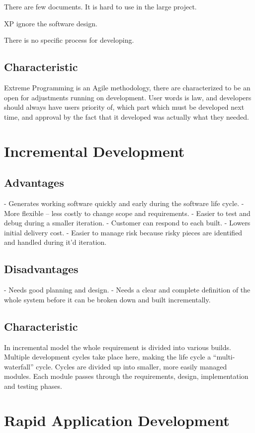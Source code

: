 There are few documents. It is hard to use in the large project.

XP ignore the  software design.

There is no specific process for developing.

\subsection*{Characteristic}
Extreme Programming is an Agile methodology, there are characterized to be an open for adjustments running on development. User words is law, and developers should always have users priority of, which part which must be developed next time, and approval by the fact that it developed was actually what they needed.

\section*{Incremental Development}

\subsection*{Advantages}
- Generates working software quickly and early during the software life cycle.
- More flexible – less costly to change scope and requirements.
- Easier to test and debug during a smaller iteration.
- Customer can respond to each built.
- Lowers initial delivery cost.
- Easier to manage risk because risky pieces are identified and handled during it’d iteration.

\subsection*{Disadvantages}
- Needs good planning and design.
- Needs a clear and complete definition of the whole system before it can be broken down and built incrementally.

\subsection*{Characteristic}
In incremental model the whole requirement is divided into various builds. Multiple development cycles take place here, making the life cycle a “multi-waterfall” cycle.  Cycles are divided up into smaller, more easily managed modules.  Each module passes through the requirements, design, implementation and testing phases.

\section*{Rapid Application Development}

